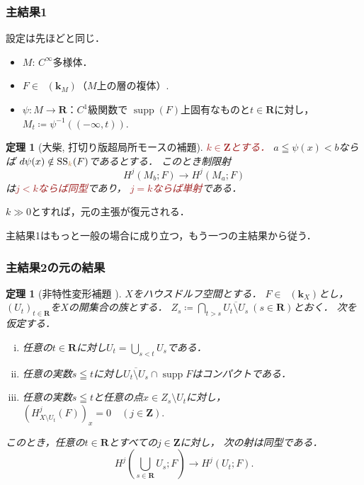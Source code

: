 \documentclass[dvipdfmx,10pt,aspectratio=169,leqno]{beamer}%
\newcommand{\zz}{\mathbf{Z}}
\newcommand{\rr}{\mathbf{R}}
\newcommand{\kk}{\mathbf{k}}
\numberwithin{equation}{subsection}
\newcommand{\supp}{\mathop{\mathrm{supp}}\nolimits}
\newcommand{\Dompl}{\mathop{\mathsf{D}^\mathrm{+}}\nolimits}
\newcommand{\Dompb}{\mathop{\mathsf{D}^\mathrm{b}}\nolimits}
\newcommand{\muS}[1][]{\mathop{\mathrm{SS}}\nolimits_{#1}}
\theoremstyle{mystyle}
\newtheorem{THM}[AXM]{定理}
\begin{document}
\begin{frame}
    \frametitle{主結果1}
    設定は先ほどと同じ．
    \begin{itemize}
        \item \(M\): \(C^{\infty}\)多様体．
        \item \(F\in\Dompb(\kk_{M})\)（\(M\)上の層の複体）.
        \item \(\psi\colon M\to \rr\)：\(C^1\)級関数で
        \(\supp(F)\)上固有なものと\(t\in\rr\)に対し，\(M_{t}\coloneqq \psi^{-1}((-\infty,t))\).
    \end{itemize}
    \begin{THM}[大柴, 打切り版超局所モースの補題]
        \textcolor{brown}{\(k\in\zz\)とする．}
        \(a\leqq\psi(x)< b\)ならば
        \(d\psi(x)\notin\muS[\textcolor{brown}{k}](F)\)であるとする．
        このとき制限射\[
            H^{j}(M_b;F)\longrightarrow H^{j}(M_a;F)
        \]は\textcolor{brown}{\(j<k\)ならば同型}であり，
        \textcolor{brown}{\(j=k\)ならば単射}である．
    \end{THM}    
    \(k\gg0\)とすれば，元の主張が復元される．

    主結果1はもっと一般の場合に成り立つ，もう一つの主結果から従う．
\end{frame}
\begin{frame}
    \frametitle{主結果2の元の結果}
  \begin{THM}[非特性変形補題 {\cite{KS90}}]
    \(X\)をハウスドルフ空間とする．
    \(F\in\Dompl(\kk_X)\)とし，
    \(\left(U_{t}\right)_{t\in\rr}\)を\(X\)の開集合の族とする．
    \(
      Z_{s}\coloneqq \bigcap_{t>s}\overline{U_t\setminus U_s}\ (s\in\rr)
    \)とおく．
    次を仮定する．%
    \begin{enumerate}[(i)]
      \setlength{\leftskip}{10pt}
      \item \label{item:nonchar1}
      任意の\(t\in\rr\)に対し\(U_{t}=\bigcup_{s<t}U_{s}\)である．
      \item \label{item:nonchar2}
      任意の実数\(s\leqq t\)に対し\(
        \overline{U_{t}\setminus U_{s}}\cap \supp{F}
      \)はコンパクトである．
      \item \label{item:nonchar3}
      任意の実数\(s\leqq t\)と任意の点\(x\in Z_{s}\setminus U_{t}\)に対し，
      \(
        (H^{j}_{X\setminus U_{t}}(F))_{x}=0\quad (j\in\zz). 
      \)
    \end{enumerate}
    このとき，任意の\(t\in\rr\)とすべての\(j\in\zz\)に対し，
    次の射は同型である．\[
      H^{j}\left(\bigcup_{s\in\rr}U_{s};F\right)
      \to
      H^{j}\left(U_{t};F\right).
    \]
  \end{THM}
\end{frame}
\end{document}
